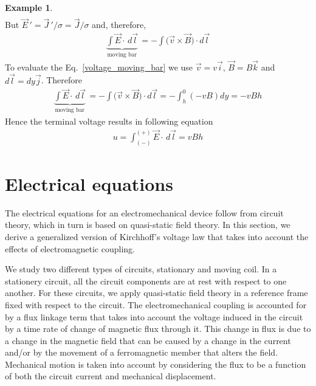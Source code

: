 \documentclass[11pt,a4paper,oneside]{book}
\numberwithin{equation}{section}
\theoremstyle{it}
\theoremstyle{definition}
\newtheorem{example}{Example}[section]
\begin{document}
\begin{example}
\begin{equation*}
\begin{aligned}
	\end{aligned}
\end{equation*} 
But $\vec{E}\,'=\vec{J}\,'/\sigma = \vec{J}/\sigma$ and, therefore, 
\begin{equation}\label{voltage_moving_bar}
	\begin{aligned}
		\underbrace{\int\vec{E}\cdot\,d\vec{l}}_{\text{moving bar}} \, = 
		-\int\Big(\vec{v}\times\vec{B}\Big)\cdot d\vec{l}
	\end{aligned}
\end{equation} 
To evaluate the Eq.~\eqref{voltage_moving_bar} we use $\vec{v} = v\vec{i}$, $\vec{B} = B\vec{k}$ and $d\vec{l}=dy\vec{j}$.
Therefore 
\begin{equation*}\label{}
	\begin{aligned} 
		\underbrace{\int\vec{E}\cdot\,d\vec{l}}_{\text{moving bar}} \, = -\int\Big(\vec{v}\times\vec{B}\Big)\cdot d\vec{l} = -\int_{h}^{0}(-vB)dy=-vBh
	\end{aligned}
\end{equation*} 
Hence the terminal voltage results in following equation
\begin{equation}\label{}
	\begin{aligned}
		u = \int_{(-)}^{(+)}\vec{E}\cdot\,d\vec{l} = vBh
	\end{aligned}
\end{equation} 
\end{example}

\section{Electrical equations}
The electrical equations for an electromechanical device follow from circuit theory, which in turn is based on quasi-static field theory. In this section, we derive a generalized version of Kirchhoff's voltage law that takes into account the effects of electromagnetic coupling.

We study two different types of circuits, stationary and moving coil. In a stationery circuit, all the circuit components are at rest with respect to one another. For these circuits, we apply quasi-static field theory in a reference frame fixed with respect to the circuit. The electromechanical coupling is accounted for by a flux linkage term that takes into account the voltage induced in the circuit by a time rate of change of magnetic flux through it. This change in flux is due to a change in the magnetic field that can be caused by a change in the current and/or by the movement of a ferromagnetic member that alters the field. Mechanical motion is taken into account by considering the flux to be a function of both the circuit current and mechanical displacement.
\end{document}
